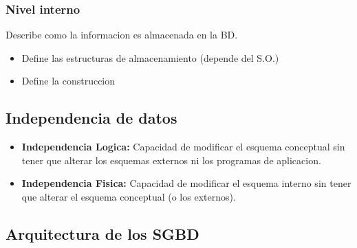 \documentclass[twoside]{article}
\begin{document}
\subsubsection{Nivel interno}

Describe como la informacion es almacenada en la BD.

\begin{itemize}
  \item Define las estructuras de almacenamiento (depende del S.O.)
  \item Define la construccion
\end{itemize}

\subsection{Independencia de datos}

\begin{itemize}
  \item \textbf{Independencia Logica:} Capacidad de modificar el esquema conceptual sin tener que alterar los esquemas externos ni los programas de aplicacion.
  \item \textbf{Independencia Fisica:} Capacidad de modificar el esquema interno sin tener que alterar el esquema conceptual (o los externos).
\end{itemize}

\subsection{Arquitectura de los SGBD}
\end{document}
